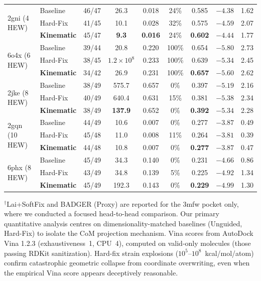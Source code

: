 \documentclass{article}
\begin{document}
\begin{table}[H]
\begin{tabular}{l l c c c c c c c}
    \midrule
    \multirow{3}{*}{2gni (4 HEW)}
      & Baseline    & 46/47 & 26.3    & 0.018 & 24\% & 0.585 & $-4.38$ & 1.62 \\
      & Hard-Fix    & 41/45 & 10.1    & 0.028 & 32\% & 0.575 & $-4.59$ & 2.07 \\
      & \textbf{Kinematic} & 45/47 & \textbf{9.3}  & \textbf{0.016} & 24\% & \textbf{0.602} & $-4.44$ & 1.77 \\
    \midrule
    \multirow{3}{*}{6o4x (6 HEW)}
      & Baseline    & 39/44 & 20.8    & 0.220 & 100\% & 0.654 & \textbf{$-5.80$} & 2.73 \\
      & Hard-Fix    & 38/45 & $1.2{\times}10^8$ & 0.233 & 100\% & 0.639 & $-5.34$ & 2.45 \\
      & \textbf{Kinematic} & 34/42 & 26.9    & 0.231 & 100\% & \textbf{0.657} & $-5.60$ & 2.62 \\
    \midrule
    \multirow{3}{*}{2jke (8 HEW)}
      & Baseline    & 38/49 & 575.7   & 0.657 & 0\%   & 0.397 & $-5.19$ & 2.16 \\
      & Hard-Fix    & 40/49 & 640.4   & 0.631 & 15\%  & 0.381 & \textbf{$-5.38$} & 2.34 \\
      & \textbf{Kinematic} & 38/49 & \textbf{137.9} & 0.652 & 0\% & \textbf{0.392} & $-5.34$ & 2.28 \\
    \midrule
    \multirow{3}{*}{2gqn (10 HEW)}
      & Baseline    & 44/49 & 10.6    & 0.007 & 0\%   & 0.277 & $-3.87$ & 0.49 \\
      & Hard-Fix    & 45/48 & 11.0   & 0.008 & 11\%  & 0.264 & $-3.81$ & 0.39 \\
      & \textbf{Kinematic} & 44/48 & 10.8    & 0.007 & 0\%   & \textbf{0.277} & \textbf{$-3.87$} & 0.47 \\
    \midrule
    \multirow{3}{*}{6phx (8 HEW)}
      & Baseline    & 45/49 & 34.3    & 0.140 & 0\%   & 0.231 & $-4.66$ & 0.86 \\
      & Hard-Fix    & 43/49 & 34.8   & 0.139 & 5\%   & 0.225 & $-4.92$ & 1.34 \\
      & \textbf{Kinematic} & 45/49 & 192.3   & 0.143 & 0\%   & \textbf{0.229} & \textbf{$-4.99$} & 1.30 \\
    \bottomrule
  \end{tabular}

  \vspace{4pt}
  \footnotesize
  $^\dagger$Lai+SoftFix and BADGER (Proxy) are reported for the 3mfw pocket
  only, where we conducted a focused head-to-head comparison.  Our primary
  quantitative analysis centres on dimensionality-matched baselines
  (Unguided, Hard-Fix) to isolate the CoM projection mechanism.
  Vina scores from AutoDock Vina 1.2.3 (exhaustiveness~1, CPU~4),
  computed on valid-only molecules (those passing RDKit sanitization).
  Hard-fix strain explosions ($10^5$--$10^8$~kcal/mol/atom) confirm
  catastrophic geometric collapse from coordinate overwriting, even when
  the empirical Vina score appears deceptively reasonable.
\end{table}
\end{document}

